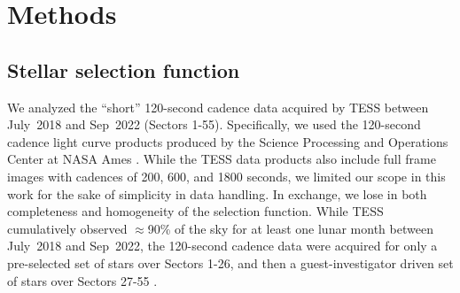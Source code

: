 \documentclass[11pt,twocolumn,tighten]{aastex63}
\begin{document}
\section{Methods}
\label{sec:methods}

\subsection{Stellar selection function}
\label{subsec:selectionfn}

We analyzed the ``short'' 120-second cadence data acquired by TESS
between July~2018 and Sep~2022 (Sectors 1-55).  Specifically, we used
the 120-second cadence light curve products produced by the 
Science Processing and Operations Center at NASA Ames
\citep{2016SPIE.9913E..3EJ}.  While the TESS data products also
include full frame images with cadences of 200, 600, and 1800 seconds,
we limited our scope in this work for the sake of simplicity in data
handling.  In exchange, we lose in both completeness and homogeneity
of the selection function.  While TESS cumulatively observed
$\approx$90\% of the sky for at least one lunar month between
July~2018 and Sep~2022, the 120-second cadence data were acquired for
only a pre-selected set of stars over Sectors 1-26, and then a
guest-investigator driven set of stars over Sectors 27-55
\citep{2021PASP..133i5002F}.
\end{document}
